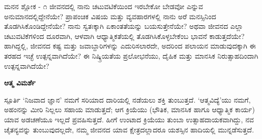 
\newpage
\begin{mananam}{\mananamfont ಮನನ ಶ್ಲೋಕ - ೧}
\mananamtext ಜೀವನದಲ್ಲಿ ನಾನು ಚಟುವಟಿಕೆಯಿಂದ ಇರಬೇಕೋ ಬೇಡವೋ ಎನ್ನುವ ಅನುಮಾನದಲ್ಲಿದ್ದೇನೆಯೇ? ಪ್ರಾಪಂಚಿಕ ವಿಷಯ ಮತ್ತು ವ್ಯವಹಾರಗಳಲ್ಲಿ  ನಾನು ಅರೆ ಮನಸ್ಸಿನಿಂದ ತೊಡಗಿಸಿಕೊಂಡಿದ್ದೇನೆಯೇ? ನಾನು ಸ್ವತಃಕ್ಕಾಗಿ ಏಕಾಂತತೆಯನ್ನು ಬಯಸುತ್ತೇನೆಯೇ? ಅಥವಾ ಜೀವನದ ಎಲ್ಲಾ ಚಟುವಟಿಕೆಗಳಿಂದ ದೂರವಾಗಿ, ಆಳವಾಗಿ ಆಧ್ಯಾತ್ಮಿಕತೆಯಲ್ಲಿ ತೊಡಗಿಸಿಕೊಳ್ಳಬೇಕೆಂಬ ಭಾವನೆ ಕಾಡುತ್ತದೆಯೇ? ಹಾಗಿದ್ದಲ್ಲಿ, ಜೀವನದ ಕಷ್ಟ ಮತ್ತು ಜವಾಬ್ದಾರಿಗಳನ್ನು ಎದುರಿಸಲಾರದೇ, ಅದರಿಂದ ಪಲಾಯನ ಮಾಡುವುದಕ್ಕಾಗಿ ಈ ತರಹದ ಇಚ್ಛೆ ಉತ್ಪನ್ನವಾಗಿದೆಯೇ? ಈ ನಿಷ್ಕ್ರಿಯತೆಯ ಪ್ರಲೋಭನೆಯು, ದೈಹಿಕ ಮತ್ತು ಮಾನಸಿಕ ನಿರುತ್ಸಾಹದಿಂದಾಗಿ ಉತ್ಪನ್ನವಾಗಿದೆಯೇ?
\end{mananam}
\WritingHand\enspace\textbf{ಆತ್ಮ ವಿಮರ್ಶೆ}\\
\begin{inspiration}{\mananamfont ಸ್ಪೂರ್ತಿ}
\mananamtext ‘ನಿಜವಾದ ಜ್ಞಾನ’ ನಮಗೆ ಸರಿಯಾದ ದಾರಿಯಲ್ಲಿ ನಡೆಯಲು ಶಕ್ತಿ ತುಂಬುತ್ತದೆ. ‘ಆತ್ಮವಿದ್ಯೆ’ಯು ನಮಗೆ, ಅಹಂನನ್ನು ಮೀರಿ ನಿಲ್ಲಲು ಸಹಾಯ ಮಾಡುತ್ತದೆ; ಆಗ ಕ್ರಿಯೆಯು (ಭೌತಿಕ, ಮಾನಸಿಕ ಹಾಗೂ ಆಧ್ಯಾತ್ಮಿಕ ಕಾರ್ಯ) ಯಾವ ಅಡಚಣೆಯೂ ಇಲ್ಲದೆ ಪ್ರವಹಿಸುತ್ತದೆ. ಹೀಗೆ ಉಂಟಾದ ಕ್ರಿಯೆಯು ತುಂಬಾ ಉತ್ಸಾಹದಾಯಕವಾಗಿದ್ದು, ನವ ಚೈತನ್ಯವನ್ನು ತುಂಬುವುದಲ್ಲದೇ, ನಮ್ಮ ಜೀವನದ ಯಾವ ಕ್ಷೇತ್ರದಲ್ಲಾದರೂ ಯಶಸ್ಸಿನ ಹಾದಿಯಲ್ಲಿ ಮುನ್ನಡೆಸುತ್ತದೆ.  
\end{inspiration}
\newpage

